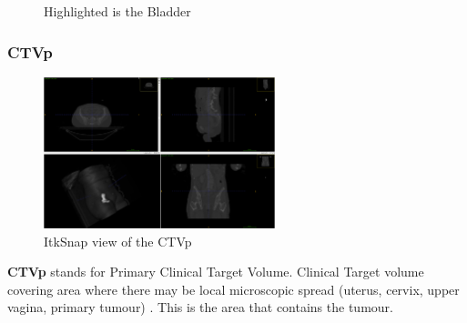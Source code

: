\documentclass[11pt]{article}
\begin{document}
\begin{figure}[H]
    \centering
    \caption{Highlighted is the Bladder}\label{fig:Anorectum}
\end{figure}

\subsubsection{CTVp}

\begin{figure}[H]
    \centering
    \includegraphics[width=0.6\textwidth]{images/CTVp.png}
    \caption{ItkSnap view of the CTVp}\label{fig:CTVn}
\end{figure}

\textbf{CTVp} stands for Primary Clinical Target Volume. Clinical Target volume covering area where there may be local microscopic spread (uterus, cervix, upper vagina, primary tumour) \cite{AMLART-data}. This is the area that contains the tumour.
\end{document}
